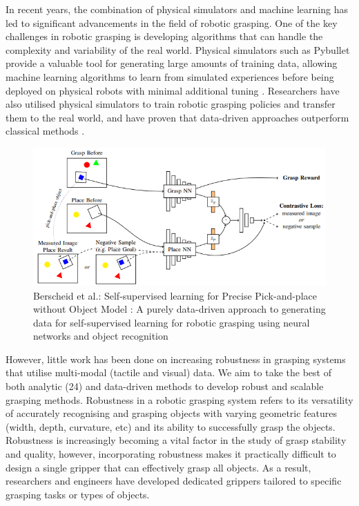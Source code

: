 \documentclass[11pt, a4paper]{report}
\begin{document}
In recent years, the combination of physical simulators and machine learning has led to significant advancements in the field of robotic grasping. One of the key challenges in robotic grasping is developing algorithms that can handle the complexity and variability of the real world. Physical simulators such as Pybullet \cite{coumans2021} provide a valuable tool for generating large amounts of training data, allowing machine learning algorithms to learn from simulated experiences before being deployed on physical robots with minimal additional tuning \cite{berscheid2020selfsupervised}. Researchers have also utilised physical simulators to train robotic grasping policies \cite{Chebotar_2017} and transfer them to the real world, and have proven that data-driven approaches outperform classical methods \cite{zhang2022robotic}.
\begin{figure}[ht]
    \centering
    \includegraphics[width=\textwidth]{docs/Project Report/Media/berscheid_2020_sl_for_precise_pickandplace_wo_obj_model_network.png}
    \caption{Berscheid et al.: Self-supervised learning for Precise Pick-and-place without Object Model \cite{berscheid2020selfsupervised}: A purely data-driven approach to generating data for self-supervised learning for robotic grasping using neural networks and object recognition}
    \label{fig:1.1}
\end{figure}

However, little work has been done on increasing robustness in grasping systems that utilise multi-modal (tactile and visual) data. We aim to take the best of both analytic (24) and data-driven methods \cite{berscheid2020selfsupervised, pinto2015supersizing} to develop robust and scalable grasping methods. Robustness in a robotic grasping system refers to its versatility of accurately recognising and grasping objects with varying geometric features (width, depth, curvature, etc) and its ability to successfully grasp the objects. Robustness is increasingly becoming a vital factor in the study of grasp stability and quality, however, incorporating robustness makes it practically difficult to design a single gripper that can effectively grasp all objects. As a result, researchers and engineers have developed dedicated grippers tailored to specific grasping tasks or types of objects.\\
\end{document}
